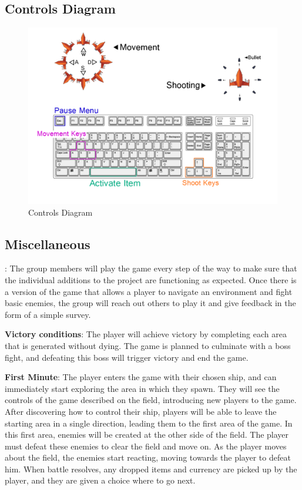 \documentclass[12pt]{article}       %
\def\hs{\hspace{15pt}}
\begin{document}
\subsection{Controls Diagram}

\begin{figure} [H]
\centering
\includegraphics[width=6.1 in]{ControlDiagram2.png}
\caption{Controls Diagram} \label{Controls}
\end{figure}

\subsection{Miscellaneous}
\hs {\bf Testing plans}: The group members will play the game every step of the way to make sure that the individual additions to the project are functioning as expected. Once there is a version of the game that allows a player to navigate an environment and fight basic enemies, the group will reach out others to play it and give feedback in the form of a simple survey. 

{\bf Victory conditions}: The player will achieve victory by completing each area that is generated without dying. The game is planned to culminate with a boss fight, and defeating this boss will trigger victory and end the game.

{\bf First Minute}: The player enters the game with their chosen ship, and can immediately start exploring the area in which they spawn. They will see the controls of the game described on the field, introducing new players to the game. After discovering how to control their ship, players will be able to leave the starting area in a single direction, leading them to the first area of the game. In this first area, enemies will be created at the other side of the field. The player must defeat these enemies to clear the field and move on. As the player moves about the field, the enemies start reacting, moving towards the player to defeat him. When battle resolves, any dropped items and currency are picked up by the player, and they are given a choice where to go next.
\end{document}
